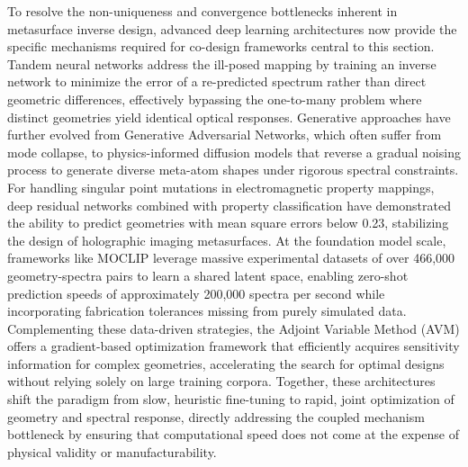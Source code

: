 \documentclass[11pt]{article}
\begin{document}
To resolve the non-uniqueness and convergence bottlenecks inherent in metasurface inverse design, advanced deep learning architectures now provide the specific mechanisms required for co-design frameworks central to this section. Tandem neural networks address the ill-posed mapping by training an inverse network to minimize the error of a re-predicted spectrum rather than direct geometric differences, effectively bypassing the one-to-many problem where distinct geometries yield identical optical responses. \citep{doi_10_1063_5_0171437_92a49ec0} \citep{doi_10_1515_nanoph_2021_0434_1357d09e} Generative approaches have further evolved from Generative Adversarial Networks, which often suffer from mode collapse, to physics-informed diffusion models that reverse a gradual noising process to generate diverse meta-atom shapes under rigorous spectral constraints. \citep{doi_10_71465_fapm546_bda368a5} For handling singular point mutations in electromagnetic property mappings, deep residual networks combined with property classification have demonstrated the ability to predict geometries with mean square errors below 0.23, stabilizing the design of holographic imaging metasurfaces. At the foundation model scale, frameworks like MOCLIP leverage massive experimental datasets of over 466,000 geometry-spectra pairs to learn a shared latent space, enabling zero-shot prediction speeds of approximately 200,000 spectra per second while incorporating fabrication tolerances missing from purely simulated data. Complementing these data-driven strategies, the Adjoint Variable Method (AVM) offers a gradient-based optimization framework that efficiently acquires sensitivity information for complex geometries, accelerating the search for optimal designs without relying solely on large training corpora. \citep{doi_10_2528_pier12020501_bb5007b1} \citep{doi_10_1109_nemo62710_2025_11215427_067e96bb} Together, these architectures shift the paradigm from slow, heuristic fine-tuning to rapid, joint optimization of geometry and spectral response, directly addressing the coupled mechanism bottleneck by ensuring that computational speed does not come at the expense of physical validity or manufacturability. \citep{doi_10_1038_s41467_026_76714_x_8ca5d39b} \citep{doi_10_71465_fapm546_bda368a5} \citep{doi_10_1109_iccem60619_2024_10559188_c3199408} \citep{doi_10_1109_pn62551_2024_10621761_0bc70b78}
\end{document}
